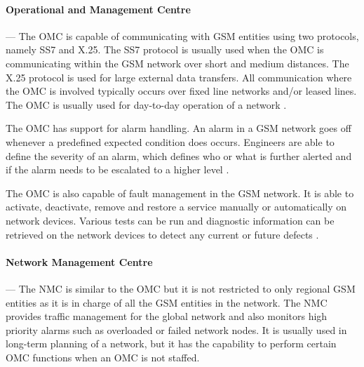 \paragraph{Operational and Management Centre}
--- The OMC is capable of communicating with GSM entities using two protocols, namely SS7 and X.25. The SS7 protocol is usually used when the OMC is communicating within the GSM network over short and medium distances. The X.25 protocol is used for large external data transfers. All communication where the OMC is involved typically occurs over fixed line networks and/or leased lines. The OMC is usually used for day-to-day operation of a network \cite{GSMSysEngin}.

The OMC has support for alarm handling. An alarm in a GSM network goes off whenever a predefined expected condition does occurs. Engineers are able to define the severity of an alarm, which defines who or what is further alerted and if the alarm needs to be escalated to a higher level \cite{GSMSysEngin}.

The OMC is also capable of fault management in the GSM network. It is able to activate, deactivate, remove and restore a service manually or automatically on network devices\cite{GSM92}. Various tests can be run and diagnostic information can be retrieved on the network devices to detect any current or future defects \cite{GSMSysEngin}.

\paragraph{Network Management Centre}
--- The NMC is similar to the OMC but it is not restricted to only regional GSM entities as it is in charge of all the GSM entities in the network. The NMC provides traffic management for the global network and also monitors high priority alarms such as overloaded or failed network nodes. It is usually used in long-term planning of a network, but it has the capability to perform certain OMC functions when an OMC is not staffed. 

